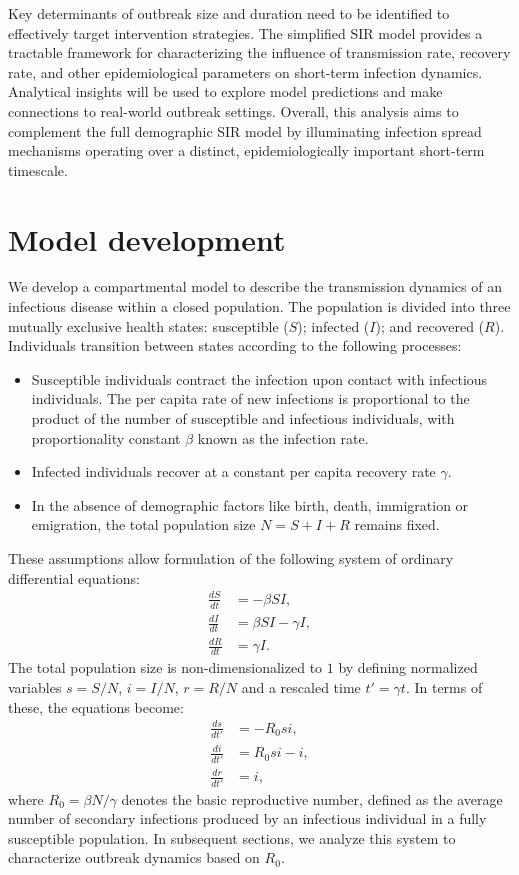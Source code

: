 Key determinants of outbreak size and duration need to be identified to effectively target intervention strategies. The simplified SIR model provides a tractable framework for characterizing the influence of transmission rate, recovery rate, and other epidemiological parameters on short-term infection dynamics. Analytical insights will be used to explore model predictions and make connections to real-world outbreak settings. Overall, this analysis aims to complement the full demographic SIR model by illuminating infection spread mechanisms operating over a distinct, epidemiologically important short-term timescale.

\section{Model development}

We develop a compartmental model to describe the transmission dynamics of an infectious disease within a closed population. The population is divided into three mutually exclusive health states: susceptible ($S$); infected ($I$); and recovered ($R$). Individuals transition between states according to the following processes:
\begin{itemize}
\item Susceptible individuals contract the infection upon contact with infectious individuals. The per capita rate of new infections is proportional to the product of the number of susceptible and infectious individuals, with proportionality constant $\beta$ known as the infection rate.
\item Infected individuals recover at a constant per capita recovery rate $\gamma$.
\item In the absence of demographic factors like birth, death, immigration or emigration, the total population size $N=S+I+R$ remains fixed.
\end{itemize}

These assumptions allow formulation of the following system of ordinary differential equations:
\begin{align}
\frac{dS}{dt} & = -\beta SI, \label{eq:16.01}\\
\frac{dI}{dt} & = \beta SI - \gamma I, \label{eq:16.02}\\
\frac{dR}{dt} & = \gamma I. \label{eq:16.03}
\end{align}
The total population size is non-dimensionalized to $1$ by defining normalized variables $s=S/N$, $i=I/N$, $r=R/N$ and a rescaled time $t'=\gamma t$. In terms of these, the equations become:
\begin{align}
\frac{ds}{dt'} & = -R_0 s i, \label{eq:16.04}\\
\frac{di}{dt'} & = R_0 s i - i, \label{eq:16.05}\\
\frac{dr}{dt'} & = i, \label{eq:16.06}
\end{align}
where $R_0=\beta N/\gamma$ denotes the basic reproductive number, defined as the average number of secondary infections produced by an infectious individual in a fully susceptible population. In subsequent sections, we analyze this system to characterize outbreak dynamics based on $R_0$.

